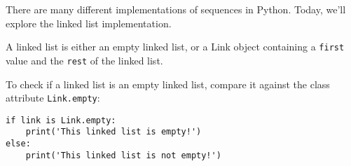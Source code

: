 There are many different implementations of sequences in Python. Today, we'll
explore the linked list implementation.

A linked list is either an empty linked list, or a Link object containing a
\texttt{first} value and the \texttt{rest} of the linked list.

To check if a linked list is an empty linked list, compare it against the class
attribute \texttt{Link.empty}:
\begin{lstlisting}
if link is Link.empty:
    print('This linked list is empty!')
else:
    print('This linked list is not empty!')
\end{lstlisting}
